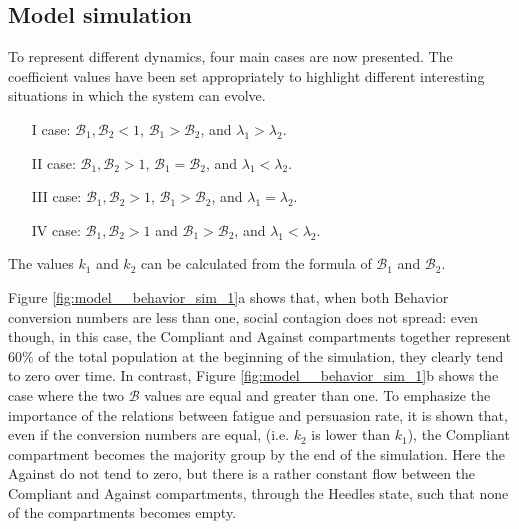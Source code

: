 \subsection{Model simulation}
To represent different dynamics, four main cases are now presented. The coefficient values have been set appropriately to highlight different interesting situations in which the system can evolve.

\begin{itemize}
	\item[I] case: $\mathcal{B}_1, \mathcal{B}_2 <1$, $\mathcal{B}_1 >  \mathcal{B}_2$, and $\lambda_1 > \lambda_2$.
	\item[II] case: $\mathcal{B}_1, \mathcal{B}_2 >1$, $\mathcal{B}_1 =  \mathcal{B}_2$, and $\lambda_1 < \lambda_2$.
	\item[III] case: $\mathcal{B}_1, \mathcal{B}_2 >1$, $\mathcal{B}_1 >  \mathcal{B}_2$, and $\lambda_1 = \lambda_2$.
	\item[IV] case: $\mathcal{B}_1, \mathcal{B}_2 >1$ and $\mathcal{B}_1 >  \mathcal{B}_2$, and $\lambda_1 < \lambda_2$.
\end{itemize}

The values $k_1$ and $k_2$ can be calculated from the formula of $\mathcal{B}_1$ and $\mathcal{B}_2$.

Figure \ref{fig:model__behavior_sim_1}a shows that, when both Behavior conversion numbers are less than one, social contagion does not spread: even though, in this case, the Compliant and Against compartments together represent $60\%$ of the total population at the beginning of the simulation, they clearly tend to zero over time. In contrast, Figure \ref{fig:model__behavior_sim_1}b shows the case where the two $\mathcal{B}$ values are equal and greater than one. To emphasize the importance of the relations between fatigue and persuasion rate, it is shown that, even if the conversion numbers are equal, (i.e. $k_2$  is lower than $k_1$), the Compliant compartment becomes the majority group by the end of the simulation. Here the Against do not tend to zero, but there is a rather constant flow between the Compliant and Against compartments, through the Heedles state, such that
none of the compartments becomes empty.

